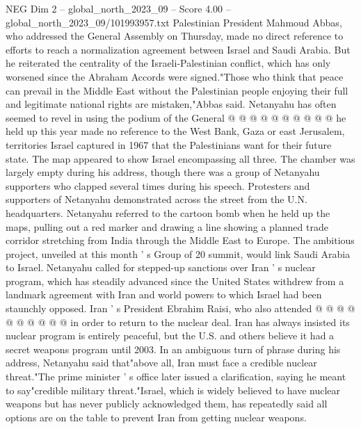 \begin{textsample}{NEG Dim 2 – global\_north\_2023\_09 – Score 4.00 – global\_north\_2023\_09/101993957.txt}
Palestinian President Mahmoud Abbas, who addressed the General Assembly on Thursday, made no direct reference to efforts to reach a normalization agreement between Israel and Saudi Arabia.
But he reiterated the centrality of the Israeli-Palestinian conflict, which has only worsened since the Abraham Accords were signed."Those who think that peace can prevail in the Middle East without the Palestinian people enjoying their full and legitimate national rights are mistaken,"Abbas said.
Netanyahu has often seemed to revel in using the podium of the General @ @ @ @ @ @ @ @ @ @ he held up this year made no reference to the West Bank, Gaza or east Jerusalem, territories Israel captured in 1967 that the Palestinians want for their future state.
The map appeared to show Israel encompassing all three.
The chamber was largely empty during his address, though there was a group of Netanyahu supporters who clapped several times during his speech.
Protesters and supporters of Netanyahu demonstrated across the street from the U.N. headquarters.
Netanyahu referred to the cartoon bomb when he held up the maps, pulling out a red marker and drawing a line showing a planned trade corridor stretching from India through the Middle East to Europe.
The ambitious project, unveiled at this month ' s Group of 20 summit, would link Saudi Arabia to Israel.
Netanyahu called for stepped-up sanctions over Iran ' s nuclear program, which has steadily advanced since the United States withdrew from a landmark agreement with Iran and world powers to which Israel had been staunchly opposed.
Iran ' s President Ebrahim Raisi, who also attended @ @ @ @ @ @ @ @ @ @ in order to return to the nuclear deal.
Iran has always insisted its nuclear program is entirely peaceful, but the U.S. and others believe it had a secret weapons program until 2003.
In an ambiguous turn of phrase during his address, Netanyahu said that"above all, Iran must face a credible nuclear threat."The prime minister ' s office later issued a clarification, saying he meant to say"credible military threat."Israel, which is widely believed to have nuclear weapons but has never publicly acknowledged them, has repeatedly said all options are on the table to prevent Iran from getting nuclear weapons.

\end{textsample}
